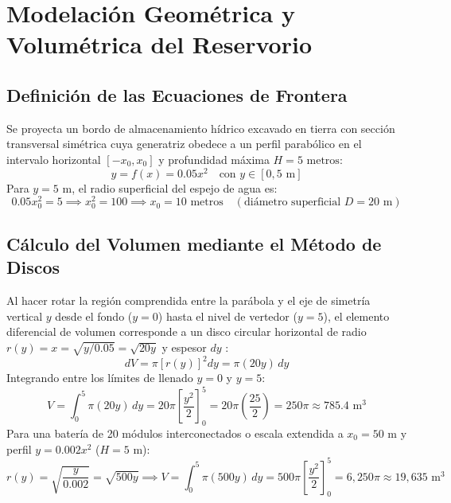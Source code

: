 \section{Modelación Geométrica y Volumétrica del Reservorio}
\subsection{Definición de las Ecuaciones de Frontera}
Se proyecta un bordo de almacenamiento hídrico excavado en tierra con sección transversal simétrica cuya generatriz obedece a un perfil parabólico en el intervalo horizontal $[-x_0, x_0]$ y profundidad máxima $H = 5\text{ metros}$:
\begin{equation}
    y = f(x) = 0.05 x^2 \quad \text{con } y \in [0, 5\text{ m}]
\end{equation}
Para $y = 5\text{ m}$, el radio superficial del espejo de agua es:
\begin{equation}
    0.05 x_0^2 = 5 \implies x_0^2 = 100 \implies x_0 = 10\text{ metros} \quad (\text{diámetro superficial } D = 20\text{ m})
\end{equation}

\subsection{Cálculo del Volumen mediante el Método de Discos}
Al hacer rotar la región comprendida entre la parábola y el eje de simetría vertical $y$ desde el fondo ($y=0$) hasta el nivel de vertedor ($y=5$), el elemento diferencial de volumen corresponde a un disco circular horizontal de radio $r(y) = x = \sqrt{y / 0.05} = \sqrt{20y}$ y espesor $dy$ \parencite{larson2014}:
\begin{equation}
    dV = \pi [r(y)]^2 dy = \pi (20y)\,dy
\end{equation}
Integrando entre los límites de llenado $y=0$ y $y=5$:
\begin{equation}
    V = \int_{0}^{5} \pi (20y)\,dy = 20\pi \left[ \frac{y^2}{2} \right]_{0}^{5} = 20\pi \left( \frac{25}{2} \right) = 250\pi \approx 785.4\text{ m}^3
\end{equation}
Para una batería de 20 módulos interconectados o escala extendida a $x_0 = 50\text{ m}$ y perfil $y = 0.002 x^2$ ($H = 5\text{ m}$):
\begin{equation}
    r(y) = \sqrt{\frac{y}{0.002}} = \sqrt{500y} \implies V = \int_0^5 \pi (500y)\,dy = 500\pi \left[ \frac{y^2}{2} \right]_0^5 = 6,250\pi \approx 19,635\text{ m}^3
\end{equation}

